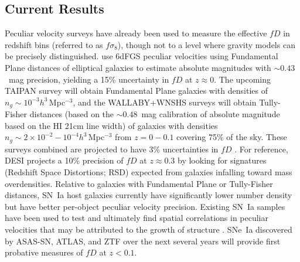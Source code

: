 \documentclass[11pt, oneside]{article}   	%
\begin{document}
\subsection{Current Results}
Peculiar velocity surveys have already been  used to measure
the effective $fD$ in redshift bins  (referred to as $f\sigma_8$), though not to a level where  gravity models can be precisely distinguished.
 \cite{2017MNRAS.471..839A} use 6dFGS peculiar velocities using  Fundamental Plane distances of elliptical galaxies to estimate absolute magnitudes
 with
 $\sim 0.43$~mag  precision, yielding a 15\% uncertainty in $fD$ at $z\approx 0$.
The upcoming 
TAIPAN survey \cite{2017PASA...34...47D} will obtain Fundamental Plane galaxies with densities of $n_g \sim 10^{-3}h^3$\,Mpc$^{-3}$,
and the WALLABY+WNSHS surveys \cite{2008ExA....22..151J} will obtain Tully-Fisher distances (based on the $\sim 0.48$~mag calibration of absolute magnitude based on the  HI 21cm line width)
of galaxies with densities $n_g \sim 2\times 10^{-2} - 10^{-4} h^3$\,Mpc$^{-3}$ from
$z=0-0.1$ covering 75\% of the sky.
These surveys combined are projected to have 3\% uncertainties in $fD$ \cite{2017MNRAS.464.2517H}.
For reference, DESI projects a 10\% precision of $fD$ at $z \approx 0.3$  by looking 
for signatures (Redshift Space Distortions; RSD) expected from galaxies infalling toward mass overdensities.
Relative to galaxies with  Fundamental Plane or Tully-Fisher distances, 
SN~Ia host galaxies currently have significantly lower number density but have better per-object peculiar velocity precision.
Existing SN~Ia samples
have been used to test and ultimately find spatial correlations in peculiar velocities that may be attributed to the growth of structure
\cite{PhysRevLett.99.081301,2008MNRAS.389L..47A,2014MNRAS.444.3926J,2015JCAP...12..033H, 2017JCAP...05..015H}.
SNe~Ia discovered by ASAS-SN, ATLAS, and ZTF \cite{2014ApJ...788...48S,2018PASP..130f4505T,2019PASP..131a8002B} over the next several years will provide first probative measures of $fD$ at $z<0.1$.
\end{document}
